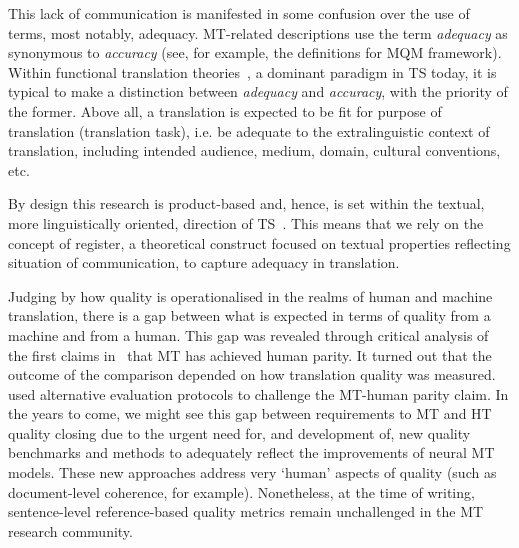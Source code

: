 This lack of communication is manifested in some confusion over the use of terms, most notably, adequacy. MT-related descriptions use the term \textit{adequacy} as synonymous to \textit{accuracy} (see, for example, the definitions for \gls{MQM} framework). Within functional translation theories~\cite[represented, for example, by][who developed the \textit{Skopos} theory of~\citet{Reiss1984}]{Nord1997,Vermeer1989}, a dominant paradigm in TS today, it is typical to make a distinction between \textit{adequacy} and \textit{accuracy}, with the priority of the former. Above all, a translation is expected to be fit for purpose of translation (translation task), i.e. be adequate to the extralinguistic context of translation, including intended audience, medium, domain, cultural conventions, etc.

By design this research is product-based and, hence, is set within the textual, more linguistically oriented, direction of TS~\cite[as opposed to cognitive, cultural and sociological branches, following disciplinary map of TS in][]{Chesterman2005}. This means that we rely on the concept of register, a theoretical construct focused on textual properties reflecting situation of communication, to capture adequacy in translation. 

Judging by how quality is operationalised in the realms of human and machine translation, there is a gap between what is expected in terms of quality from a machine and from a human. 
This gap was revealed through critical analysis of the first claims in~\citet{Hassan2018} that MT has achieved human parity. It turned out that the outcome of the comparison depended on how translation quality was measured. \citet{Laubli2018} used alternative evaluation protocols to challenge the MT-human parity claim.
In the years to come, we might see this gap between requirements to MT and HT quality closing due to the urgent need for, and development of, new quality benchmarks and methods to adequately reflect the improvements of neural MT models. These new approaches address very `human' aspects of quality (such as document-level coherence, for example). Nonetheless, at the time of writing, sentence-level reference-based quality metrics remain unchallenged in the MT research community.


